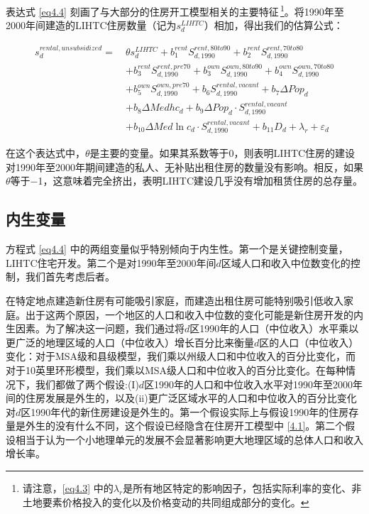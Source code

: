 \documentclass[lang=cn,11pt,a4paper]{paper}
\begin{document}
表达式 \eqref{eq4.4} 刻画了与大部分的住房开工模型相关的主要特征\,\footnote{请注意，\eqref{eq4.3} 中的$\lambda_{r}$是所有地区特定的影响因子，包括实际利率的变化、非土地要素价格投入的变化以及价格变动的共同组成部分的变化。}。将1990年至2000年间建造的LIHTC住房数量（记为$s_d^{LIHTC}$）相加，得出我们的估算公式：

\begin{equation}\label{eq4.5}
  \begin{aligned}
    s_{d}^{rental,unsubsidized}=\ & \theta s_{d}^{LIHTC}+b_{1}^{rent} S_{d, 1990}^{rent, 80 to 90}+b_{2}^{rent} S_{d, 1990}^{rent, 70 t o 80} \\
    &+b_{3}^{rent } S_{d, 1990}^{rent , pre 70}+b_{3}^{own} S_{d, 1990}^{own, 80 to90}+b_{4}^{own } S_{d, 1990}^{own, 70 to 80} \\
    &+b_{5}^{own} S_{d, 1990}^{own,pre70}+b_{6} S_{d, 1990}^{rental,vacant}+b_{7} \Delta P o p_{d} \\
    &+b_{8} \Delta M e d h c_{d}+b_{9} \Delta P o p_{d} \cdot S_{d, 1990}^{rental, vacant} \\
    &+b_{10} \Delta M e d \ln c_{d} \cdot S_{d, 1990}^{rental, vacant}+b_{11} D_{d}+\lambda_{r}+\varepsilon_{d}
    \end{aligned}
\end{equation}
\vspace{2pt}

在这个表达式中，$\theta$是主要的变量。如果其系数等于0，则表明LIHTC住房的建设对1990年至2000年期间建造的私人、无补贴出租住房的数量没有影响。相反，如果$\theta$等于$-$1，这意味着完全挤出，表明LIHTC建设几乎没有增加租赁住房的总存量。

\subsection{内生变量}

方程式 \eqref{eq4.4} 中的两组变量似乎特别倾向于内生性。第一个是关键控制变量，LIHTC住宅开发。第二个是对1990年至2000年间$d$区域人口和收入中位数变化的控制，我们首先考虑后者。

在特定地点建造新住房有可能吸引家庭，而建造出租住房可能特别吸引低收入家庭。出于这两个原因，一个地区的人口和收入中位数的变化可能是新住房开发的内生因素。为了解决这一问题，我们通过将$d$区1990年的人口（中位收入）水平乘以更广泛的地理区域的人口（中位收入）增长百分比来衡量$d$区的人口（中位收入）变化：对于MSA级和县级模型，我们乘以州级人口和中位收入的百分比变化，而对于10英里环形模型，我们乘以MSA级人口和中位收入的百分比变化。在每种情况下，我们都做了两个假设:(I)$d$区1990年的人口和中位收入水平对1990年至2000年间的住房发展是外生的，以及(ii)更广泛区域水平的人口和中位收入的百分比变化对$d$区1990年代的新住房建设是外生的。第一个假设实际上与假设1990年的住房存量是外生的没有什么不同，这个假设已经隐含在住房开工模型中 \eqref{4.1}。第二个假设相当于认为一个小地理单元的发展不会显著影响更大地理区域的总体人口和收入增长率。
\end{document}
